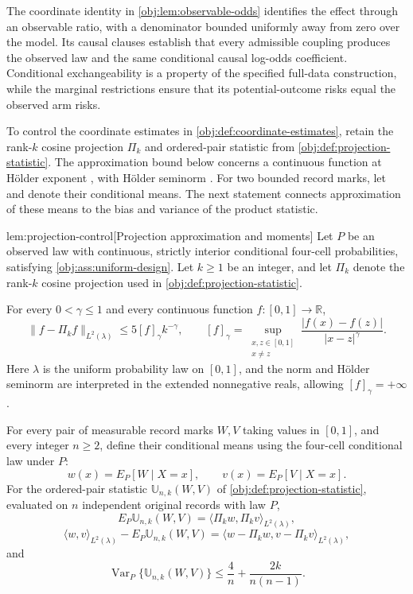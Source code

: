 The coordinate identity in \cref{obj:lem:observable-odds} identifies the effect through an observable ratio, with a denominator bounded uniformly away from zero over the model. Its causal clauses establish that every admissible coupling produces the observed law and the same conditional causal log-odds coefficient. Conditional exchangeability is a property of the specified full-data construction, while the marginal restrictions ensure that its potential-outcome risks equal the observed arm risks.

To control the coordinate estimates in \cref{obj:def:coordinate-estimates}, retain the rank-\(k\) cosine projection \(\Pi_k\) and ordered-pair statistic from \cref{obj:def:projection-statistic}. The approximation bound below concerns a continuous function  at Hölder exponent , with Hölder seminorm . For two bounded record marks, let  and  denote their conditional means. The next statement connects approximation of these means to the bias and variance of the product statistic.

\begin{lemmav}{lem:projection-control}[Projection approximation and moments]
Let \(P\) be an observed law with continuous, strictly interior conditional four-cell probabilities, satisfying \cref{obj:ass:uniform-design}. Let \(k\ge1\) be an integer, and let \(\Pi_k\) denote the rank-\(k\) cosine projection used in \cref{obj:def:projection-statistic}.

For every \(0<\gamma\le1\) and every continuous function \(f:[0,1]\to\mathbb R\),
\[
\|f-\Pi_k f\|_{L^2(\lambda)}
\le 5[f]_\gamma k^{-\gamma},
\qquad
[f]_\gamma
=
\sup_{\substack{x,z\in[0,1]\\x\ne z}}
\frac{|f(x)-f(z)|}{|x-z|^\gamma}.
\]
Here \(\lambda\) is the uniform probability law on \([0,1]\), and the norm and Hölder seminorm are interpreted in the extended nonnegative reals, allowing \([f]_\gamma=+\infty\).

For every pair of measurable record marks \(W,V\) taking values in \([0,1]\), and every integer \(n\ge2\), define their conditional means using the four-cell conditional law under \(P\):
\[
w(x)=E_P[W\mid X=x],
\qquad
v(x)=E_P[V\mid X=x].
\]
For the ordered-pair statistic \(\mathbb U_{n,k}(W,V)\) of \cref{obj:def:projection-statistic}, evaluated on \(n\) independent original records with law \(P\),
\[
E_P\mathbb U_{n,k}(W,V)
=
\langle\Pi_k w,\Pi_k v\rangle_{L^2(\lambda)},
\]
\[
\langle w,v\rangle_{L^2(\lambda)}
-
E_P\mathbb U_{n,k}(W,V)
=
\langle w-\Pi_k w,v-\Pi_k v\rangle_{L^2(\lambda)},
\]
and
\[
\operatorname{Var}_P\{\mathbb U_{n,k}(W,V)\}
\le
\frac4n+\frac{2k}{n(n-1)}.
\]
\end{lemmav}

